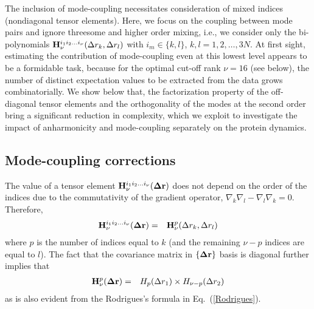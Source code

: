 \documentclass[prl,nofootinbib,twocolumn,floatfix,showpacs]{revtex4}
\begin{document}
The inclusion of mode-coupling necessitates consideration of mixed
indices (nondiagonal tensor elements). Here, we focus on the coupling
between mode pairs and ignore threesome and higher order mixing, i.e.,
we consider only the bi-polynomials ${\bf H}^{i_1i_2\dots
  i_\nu}_\nu(\Delta r_k,\Delta r_l)$ with $i_m \in \{k,l\}$,
$k,l=1,2,\dots,3N$. At first sight, estimating the contribution of
mode-coupling even at this lowest level appears to be a formidable
task, because for the optimal cut-off rank $\nu=16$ (see below), the
number of distinct expectation values to be extracted from the data
grows combinatorially. We show below that, the factorization property
of the off-diagonal tensor elements and the orthogonality of the modes
at the second order bring a significant reduction in complexity, which
we exploit to investigate the impact of anharmonicity and
mode-coupling separately on the protein dynamics.

\subsection{Mode-coupling corrections}
The value
of a tensor element ${\bf H}^{i_1i_2\dots i_\nu}_\nu({\bf \Delta r})$
does not depend on the order of the indices due to the commutativity
of the gradient operator, $\nabla_k\nabla_l -
\nabla_l\nabla_k=0$. Therefore,
\begin{eqnarray}
{\bf H}^{i_1i_2\dots i_\nu}_\nu({\bf \Delta r}) &=& {\bf H}^p_\nu(\Delta r_k,\Delta r_l) \nonumber
\end{eqnarray}
where $p$ is the number of indices equal to $k$ (and the remaining
$\nu-p$ indices are equal to $l$). The fact that the covariance matrix
in $\{{\bf \Delta r}\}$ basis is diagonal further implies that
\begin{eqnarray}
\label{factorization}
{\bf H}^p_\nu({\bf \Delta r}) &=& H_p(\Delta r_1)\times H_{\nu-p}(\Delta r_2)
\end{eqnarray}
as is also evident from the Rodrigues's formula in Eq.~(\ref{Rodrigues}).
\end{document}
